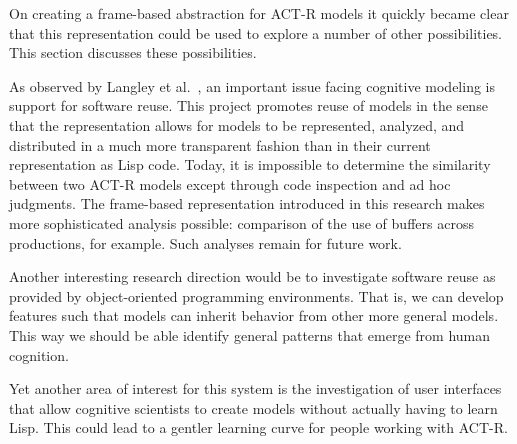 On creating a frame-based abstraction for ACT-R models it quickly
became clear that this representation could be used to explore a
number of other possibilities. This section discusses these
possibilities.

As observed by Langley et al.~\cite{citeulike:4182324}, an important
issue facing cognitive modeling is support for software reuse. This
project promotes reuse of models in the sense that the representation
allows for models to be represented, analyzed, and distributed in a
much more transparent fashion than in their current representation as
Lisp code.  Today, it is impossible to determine the similarity
between two ACT-R models except through code inspection and ad hoc
judgments.  The frame-based representation introduced in this research
makes more sophisticated analysis possible: comparison of the use of
buffers across productions, for example.  Such analyses remain for
future work.

Another interesting research direction would be to investigate software
reuse as provided by object-oriented programming environments.  That
is, we can develop features such that models can inherit behavior from
other more general models.  This way we should be able identify
general patterns that emerge from human cognition.

Yet another area of interest for this system is the investigation of
user interfaces that allow cognitive scientists to create models
without actually having to learn Lisp. This could lead to a gentler
learning curve for people working with ACT-R.

